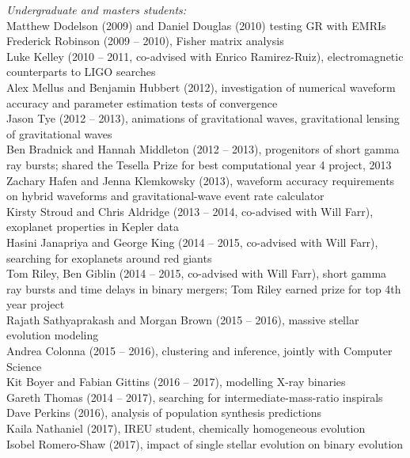 \documentclass[margin,line]{res}
\begin{document}
\begin{resume}
{\it Undergraduate and masters students:}\\
Matthew Dodelson (2009) and Daniel Douglas (2010) testing GR with EMRIs\\ 
Frederick Robinson (2009 -- 2010), Fisher matrix analysis\\
Luke Kelley (2010 -- 2011, co-advised with Enrico Ramirez-Ruiz), electromagnetic counterparts to LIGO searches\\
Alex Mellus and Benjamin Hubbert (2012), investigation of numerical waveform accuracy and parameter estimation tests of convergence\\
Jason Tye (2012 -- 2013), animations of gravitational waves, gravitational lensing of gravitational waves\\
Ben Bradnick and Hannah Middleton (2012 -- 2013), progenitors of short gamma ray bursts; shared the Tesella Prize for best computational year 4 project, 2013\\
Zachary Hafen and Jenna Klemkowsky (2013), waveform accuracy requirements on hybrid waveforms and gravitational-wave event rate calculator\\
Kirsty Stroud and Chris Aldridge (2013 -- 2014, co-advised with Will Farr),  exoplanet properties in Kepler data\\
Hasini Janapriya and George King (2014 -- 2015, co-advised with Will Farr), searching for exoplanets around red giants\\
Tom Riley, Ben Giblin (2014 -- 2015, co-advised with Will Farr), short gamma ray bursts and time delays in binary mergers; Tom Riley earned prize for top 4th year project\\
Rajath Sathyaprakash and Morgan Brown (2015 -- 2016), massive stellar evolution modeling\\
Andrea Colonna (2015 -- 2016), clustering and inference, jointly with Computer Science\\
Kit Boyer and Fabian Gittins (2016 -- 2017), modelling X-ray binaries\\
Gareth Thomas (2014 -- 2017), searching for intermediate-mass-ratio inspirals\\
Dave Perkins (2016), analysis of population synthesis predictions\\
Kaila Nathaniel (2017), IREU student, chemically homogeneous evolution\\
Isobel Romero-Shaw (2017), impact of single stellar evolution on binary evolution\\

\end{resume}
\end{document}
